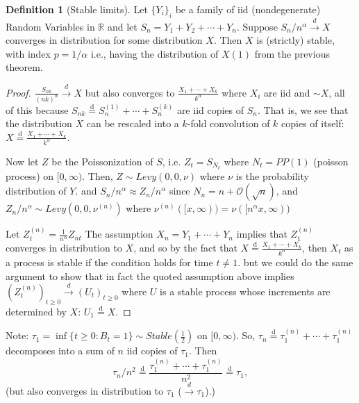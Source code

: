 \documentclass[12pt]{amsart}
\newcommand{\disteq}{\overset{ \text{d} }{=}}
\newcommand{\R}{\mathbb{R}}    %
\theoremstyle{definition}
\newtheorem{defn}[thm]{Definition}
\begin{document}
\begin{defn} [Stable limits] Let $\{Y_i\}_{i} $ be a family of iid (nondegenerate) Random Variables in $\R$ and let $S_n = Y_1 + Y_2 + \cdots + Y_n$. Suppose $S_n / n^\alpha \overset{d}{\longrightarrow} X$ converges in distribution for some distribution $X$. Then $X$ is (strictly) stable, with index $p = 1/\alpha$ i.e., having the distribution of $X(1)$ from the previous theorem.
\end{defn}

\begin{proof}
$\frac{S_{nk}}{ (nk)^{\alpha} } \overset{d}{\longrightarrow} X$ but also converges to $\frac{ X_1 + \cdots + X_k }{k^\alpha}$ where $X_i$ are iid and $\sim X$, all of this because $S_{nk} \disteq S_n ^{(1)} + \cdots + S_n ^{(k)}$ are iid copies of $S_n$. That is, we see that the distribution $X$ can be rescaled into a $k$-fold convolution of $k$ copies of itself: $X \disteq \frac{ X_1 + \cdots + X_k }{k^\alpha}$.

\bigskip{}

Now let $Z$ be the Poissonization of $S$, i.e. $Z_t = S_{N_t}$ where $N_t = PP(1)$ (poisson process) on $[0, \infty)$. Then, $Z \sim Levy (0,0, \nu)$ where $\nu$ is the probability distribution of $Y$. and $S_n / n^\alpha \approx Z_n / n^\alpha$ since $N_n = n + \mathcal{O}(\sqrt{n})$, and $Z_n / n^\alpha \sim Levy(0,0, \nu^{(n)})$ where $\nu^{(n)} ( [x , \infty) ) = \nu( [n^\alpha x, \infty) )$

\bigskip{}

Let $Z^{(n)}_t = \frac{1}{n^\alpha} Z_{nt}$ The assumption $X_n = Y_1 + \cdots + Y_n$ implies that $Z_1 ^{(n)}$ converges in distribution to $X$, and so by the fact that $X \disteq \frac{X_1 + \cdots + X_k}{k^\alpha}$, then $X_t$ as a process is stable if the condition holds for time $t \neq 1$. but we could do the same argument to show that in fact the quoted assumption above implies $(Z_t ^{(n)})_{t \geq 0} \overset{d}{\longrightarrow} (U_t)_{t \geq 0}$ where $U$ is a stable process whose increments are determined by $X$: $U_1 \disteq X$.

\end{proof}

Note: $\tau_1 = \inf \{ t \geq 0 : B_t = 1 \} \sim Stable(\tfrac{1}{2})$ on $[0, \infty)$. So, $\tau_n \disteq \tau_1 ^{(n)} + \cdots + \tau_1 ^{(n)}$ decomposes into a sum of $n$ iid copies of $\tau_1$. Then 
$$
\tau_n / n^2 \disteq \frac{\tau_1 ^{(n)} + \cdots + \tau_1 ^{(n)}}{n^2} \disteq \tau_1,
$$ 
(but also converges in distribution to $\tau_1$ ($\overset{d}{\longrightarrow} \tau_1$).)
\end{document}
